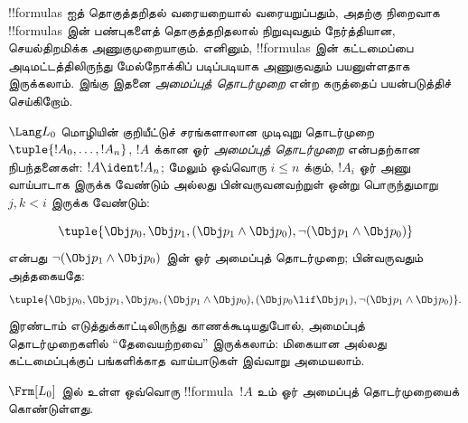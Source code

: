 \documentclass[../../../include/open-logic-section]{subfiles}
\begin{document}


!!{formula}s ஐத் தொகுத்தறிதல் வரையறையால் வரையறுப்பதும், அதற்கு
நிறைவாக !!{formula}s இன் பண்புகளைத் தொகுத்தறிதலால் நிறுவுவதும் நேர்த்தியான,
செயல்திறமிக்க அணுகுமுறையாகும். எனினும், !!{formula}s இன் கட்டமைப்பை
அடிமட்டத்திலிருந்து மேல்நோக்கிப் படிப்படியாக அணுகுவதும் பயனுள்ளதாக
இருக்கலாம். இங்கு இதனை \emph{அமைப்புத் தொடர்முறை} என்ற கருத்தைப்
பயன்படுத்திச் செய்கிறோம்.

\begin{defn}[வாய்பாடுகளுக்கான அமைப்புத் தொடர்முறைகள்]
$\Lang L_0$ மொழியின் குறியீட்டுச் சரங்களாலான முடிவுறு தொடர்முறை
$\tuple{!A_0,\dotsc,!A_n}$, $!A$ க்கான ஓர் \emph{அமைப்புத்
தொடர்முறை} என்பதற்கான நிபந்தனைகள்: $!A \ident !A_n$; மேலும் ஒவ்வொரு
$i \leq n$ க்கும், $!A_i$ ஓர் அணு வாய்பாடாக இருக்க வேண்டும் அல்லது
பின்வருவனவற்றுள் ஒன்று பொருந்துமாறு $j,k < i$ இருக்க வேண்டும்:
\begin{enumerate}
\end{enumerate}
\end{defn}

\begin{ex}
\[
\tuple{
    \Obj p_0,
    \Obj p_1,
    (\Obj p_1 \land \Obj p_0),
    \lnot (\Obj p_1 \land \Obj p_0)
}
\]
என்பது $\lnot (\Obj p_1 \land \Obj p_0)$ இன் ஓர் அமைப்புத்
தொடர்முறை; பின்வருவதும் அத்தகையதே:
\[
\tuple{
    \Obj p_0,
    \Obj p_1,
    \Obj p_0,
    (\Obj p_1 \land \Obj p_0),
    (\Obj p_0 \lif \Obj p_1),
    \lnot (\Obj p_1 \land \Obj p_0)
}.
\]
%
இரண்டாம் எடுத்துக்காட்டிலிருந்து காணக்கூடியதுபோல், அமைப்புத்
தொடர்முறைகளில் ``தேவையற்றவை'' இருக்கலாம்: மிகையான அல்லது கட்டமைப்புக்குப்
பங்களிக்காத வாய்பாடுகள் இவ்வாறு அமையலாம்.
\end{ex}

\begin{prop}
$\Frm[L_0]$ இல் உள்ள ஒவ்வொரு !!{formula}~$!A$ உம் ஓர் அமைப்புத்
தொடர்முறையைக் கொண்டுள்ளது.
\end{prop}
\end{document}
